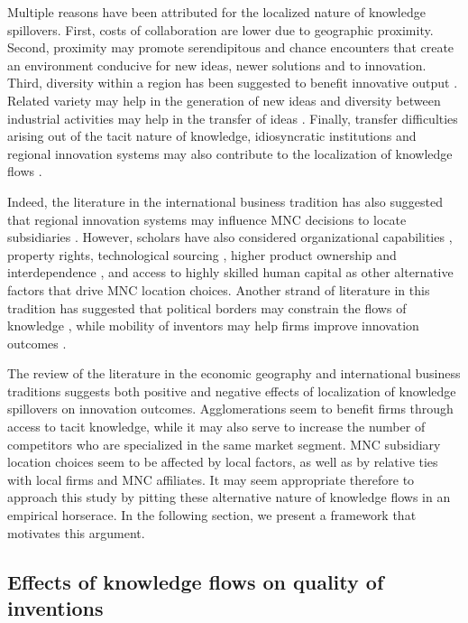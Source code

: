 \documentclass[12pt,letterpaper]{article}
\begin{document}
Multiple reasons have been attributed for the localized nature of knowledge spillovers. First, costs of collaboration are lower due to geographic proximity. Second, proximity may promote serendipitous and chance encounters that create an environment conducive for new ideas, newer solutions and to innovation. Third, diversity within a region has been suggested to benefit innovative output \citep{Feldman1999}. Related variety \citep*{Boschma2009, Frenken2007} may help in the generation of new ideas and diversity between industrial activities may help in the transfer of ideas \citep{Jacobs1969}. Finally, transfer difficulties arising out of the tacit nature of knowledge, idiosyncratic institutions and regional innovation systems may also contribute to the localization of knowledge flows  \citep{Cooke1996, Maskell1999, Howells1996, Howells2002}.

Indeed, the literature in the international business tradition has also suggested that regional innovation systems may influence MNC decisions to locate subsidiaries \citep{Andersen2005}. However, scholars have also considered organizational capabilities \citep{Zhao2006}, property rights, technological sourcing \citep{Florida1997}, higher product ownership and interdependence \citep{Pearce1999}, and access to highly skilled human capital as other alternative factors that drive MNC location choices. Another strand of literature in this tradition has suggested that political borders  may constrain the flows of knowledge \citep{Singh2013}, while mobility of inventors may help firms improve innovation outcomes \citep*{Alnuaimi2012b}.

The review of the literature in the economic geography and international business traditions suggests both positive and negative effects of localization of knowledge spillovers on innovation outcomes.  Agglomerations seem to benefit firms through access to tacit knowledge, while it may also serve to increase the number of competitors who are specialized in the same market segment. MNC subsidiary location choices seem to be affected by local factors, as well as by relative ties with local firms and MNC affiliates. It may seem appropriate therefore to approach this study by pitting these alternative nature of knowledge flows in an empirical horserace. In the following section, we present a framework that motivates this argument.  

\subsection*{Effects of knowledge flows on quality of inventions}
\end{document}
